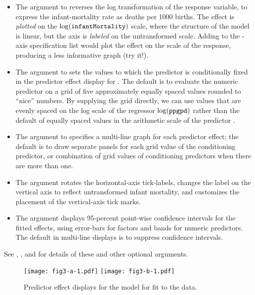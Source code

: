 \documentclass[article]{jss}
\newcommand{\lvn}[1]{\mbox{$\log(\mbox{\texttt{#1}})$}}
\begin{document}
\begin{itemize}

\item The  argument to  reverses the log transformation of the response variable, to express the infant-mortality rate as deaths per 1000 births. The effect is \emph{plotted} on the \lvn{infantMortality} scale, where the structure of the model is linear, but the axis is \emph{labeled} on the untransformed scale. Adding  to the -axis specification list would plot the effect on the scale of the response, producing a less informative graph (try it!).

\item The  argument to  sets the values to which the predictor  is conditionally fixed in the predictor effect display for . The default is to evaluate the numeric predictor  on a grid of five approximately equally spaced values rounded to ``nice'' numbers. By supplying the  grid directly, we can use values that are evenly spaced on the log scale of the regressor \lvn{ppgpd} rather than the default of equally spaced values in the arithmetic scale of the predictor .

\item The  argument to  specifies a multi-line graph for each predictor effect; the default is to draw separate panels for each grid value of the conditioning predictor, or combination of grid values of conditioning predictors when there are more than one.

\item The  argument rotates the horizontal-axis tick-labels, changes the label on the vertical axis to reflect untransformed infant mortality, and customizes the placement of the vertical-axis tick marks.

\item The argument  displays 95-percent point-wise confidence intervals for the fitted effects, using error-bars for factors and bands  for numeric predictors. The default in multi-line displays is to suppress confidence intervals.

\end{itemize}
See , , and  for details of these and other optional arguments.

\begin{figure}[t!]
\centering
\texttt{[image: fig3-a-1.pdf]}
\texttt{[image: fig3-b-1.pdf]}
\caption{Predictor effect displays for the model for  fit to the  data.\label{fig3}}
\end{figure}
\end{document}

